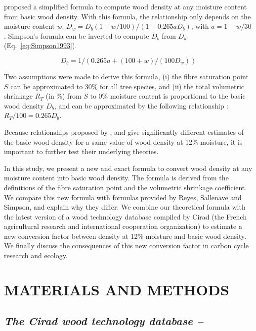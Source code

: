 \documentclass[a4paper, 12pt, leqno, dvipsnames]{article}\usepackage[]{graphicx}\usepackage[]{color}
\begin{document}
\citet{Simpson1993} proposed a simplified formula to compute wood density at any moisture content from basic wood density. With this formula, the relationship only depends on the moisture content $w$: $D_w=D_b(1+w/100)/(1-0.265aD_b)$, with $a=1-w/30$. Simpson's formula can be inverted to compute $D_b$ from $D_w$ (Eq.~\ref{eq:Simpson1993}).

\begin{equation}
  \label{eq:Simpson1993}
  D_b=1/(0.265a+(100+w)/(100D_w))
\end{equation}

Two assumptions were made to derive this formula, (i) the fibre saturation point $S$ can be approximated to 30\% for all tree species, and (ii) the total volumetric shrinkage $R_T$ (in \%) from $S$ to 0\% moisture content is proportional to the basic wood density $D_b$, and can be approximated by the following relationship \citep{Stamm1964}: $R_T/100=0.265 D_b$. 

Because relationships proposed by \citet{Reyes1992}, \citet{Sallenave1971} and \citet{Simpson1993} give significantly different estimates of the basic wood density for a same value of wood density at 12\% moisture, it is important to further test their underlying theories. 

In this study, we present a new and exact formula to convert wood density at any moisture content into basic wood density. The formula is derived from the definitions of the fibre saturation point and the volumetric shrinkage coefficient. We compare this new formula with formulas provided by Reyes, Sallenave and Simpson, and explain why they differ. We combine our theoretical formula with the latest version of a wood technology database compiled by Cirad (the French agricultural research and international cooperation organization) to estimate a new conversion factor between density at 12\% moisture and basic wood density. We finally discuss the consequences of this new conversion factor in carbon cycle research and ecology.

\newpage

\section*{MATERIALS AND METHODS}

\subsection*{\textit{The Cirad wood technology database --}}
\end{document}
